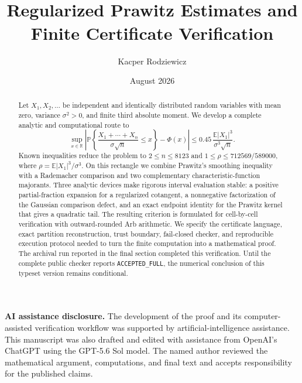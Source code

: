 \documentclass[11pt,a4paper,twoside]{article}
\title{\bfseries\color{BerryBlue}
  \PaperTitleText\\[0.35em]
  \large Regularized Prawitz Estimates and Finite Certificate Verification}
\author{Kacper Rodziewicz}
\date{August 2026}
\theoremstyle{remark}
\newcommand{\R}{\mathbb{R}}
\newcommand{\E}{\mathbb{E}}
\newcommand{\Prob}{\mathbb{P}}
\newcommand{\abs}[1]{\lvert#1\rvert}
\newcommand{\code}[1]{\texttt{#1}}
\begin{document}
\maketitle
\thispagestyle{titlepage}

\begin{abstract}
Let \(X_1,X_2,\ldots\) be independent and identically distributed random
variables with mean zero, variance \(\sigma^2>0\), and finite third absolute
moment.  We develop a complete analytic and computational route to
\[
 \sup_{x\in\R}
 \left|
   \Prob\!\left\{
     \frac{X_1+\cdots+X_n}{\sigma\sqrt n}\le x
   \right\}-\Phi(x)
 \right|
 \le
 0.45\,\frac{\E\abs{X_1}^3}{\sigma^3\sqrt n}.
\]
Known inequalities reduce the problem to
\(2\le n\le8123\) and
\(1\le\rho\le712569/589000\), where
\(\rho=\E\abs{X_1}^3/\sigma^3\).
On this rectangle we combine Prawitz's smoothing inequality with a
Rademacher comparison and two complementary characteristic-function
majorants.  Three analytic devices make rigorous interval evaluation stable:
a positive partial-fraction expansion for a regularized cotangent, a
nonnegative factorization of the Gaussian comparison defect, and an exact
endpoint identity for the Prawitz kernel that gives a quadratic tail.
The resulting criterion is formulated for cell-by-cell verification with
outward-rounded Arb arithmetic.  We specify the certificate language, exact partition
reconstruction, trust boundary, fail-closed checker, and reproducible
execution protocol needed to turn the finite computation into a mathematical
proof.
\ifcertificateaccepted
The archival run reported in the final section completed this verification.
\else
Until the complete public checker reports \code{ACCEPTED\_FULL}, the numerical
conclusion of this typeset version remains conditional.
\fi
\end{abstract}

\begin{center}
\begin{minipage}{0.92\linewidth}
\small
\noindent\textbf{AI assistance disclosure.}
The development of the proof and its computer-assisted verification workflow
was supported by artificial-intelligence assistance.  This manuscript was
also drafted and edited with assistance from OpenAI's ChatGPT using the
GPT-5.6 Sol model.  The named author reviewed the mathematical argument,
computations, and final text and accepts responsibility for the published
claims.
\end{minipage}
\end{center}
\end{document}
